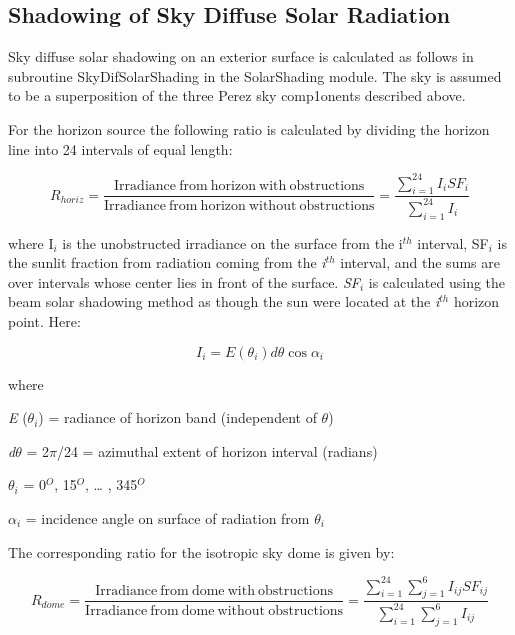 \subsection{Shadowing of Sky Diffuse Solar Radiation}\label{shadowing-of-sky-diffuse-solar-radiation}

Sky diffuse solar shadowing on an exterior surface is calculated as follows in subroutine SkyDifSolarShading in the SolarShading module. The sky is assumed to be a superposition of the three Perez sky comp1onents described above.

For the horizon source the following ratio is calculated by dividing the horizon line into 24 intervals of equal length:

\begin{equation}
{R_{horiz}} = \frac{{{\mathrm{Irradiance~from~horizon~with~obstructions}}}}{{{\mathrm{Irradiance~from~horizon~without~obstructions}}}} = \frac{{\sum\limits_{i = 1}^{24} {{I_i}S{F_i}} }}{{\sum\limits_{i = 1}^{24} {{I_i}} }}
\end{equation}

where I\(_{i}\) is the unobstructed irradiance on the surface from the i\(^{th}\) interval, SF\(_{i}\) is the sunlit fraction from radiation coming from the \emph{i}\(^{th}\) interval, and the sums are over intervals whose center lies in front of the surface. \emph{SF\(_{i}\)} is calculated using the beam solar shadowing method as though the sun were located at the \emph{i}\(^{th}\) horizon point. Here:

\begin{equation}
{I_i} = E({\theta_i})d\theta \cos {\alpha_i}
\end{equation}

where

\emph{E} (\emph{$\theta$\(_{i}\)}) = radiance of horizon band (independent of $\theta$)

\emph{d$\theta$} = 2$\pi$/24 = azimuthal extent of horizon interval (radians)

\emph{$\theta$\(_{i}\)} = 0\(^{O}\), 15\(^{O}\), \ldots{} , 345\(^{O}\)

$\alpha$\(_{i}\) = incidence angle on surface of radiation from \emph{$\theta$\(_{i}\)}

The corresponding ratio for the isotropic sky dome is given by:

\begin{equation}
{R_{dome}} = \frac{{{\mathrm{Irradiance~from~dome~with~obstructions}}}}{{{\mathrm{Irradiance~from~dome~without~obstructions}}}} = \frac{{\sum\limits_{i = 1}^{24} {\sum\limits_{j = 1}^6 {{I_{ij}}S{F_{ij}}} } }}{{\sum\limits_{i = 1}^{24} {\sum\limits_{j = 1}^6 {{I_{ij}}} } }}
\end{equation}

